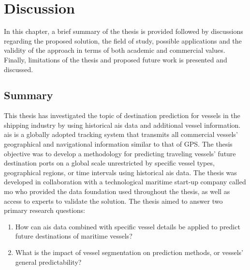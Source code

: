 \chapter{Discussion}
\label{chap:discussion}

In this chapter, a brief summary of the thesis is provided followed by discussions regarding the proposed solution, the field of study, possible applications and the validity of the approach in terms of both academic and commercial values. Finally, limitations of the thesis and proposed future work is presented and discussed.

\section{Summary}
\label{sec:summary}

This thesis has investigated the topic of destination prediction for vessels in the shipping industry by using historical \acrfull{ais} data and additional vessel information. \acrshort{ais} is a globally adopted tracking system that transmits all commercial vessels' geographical and navigational information similar to that of GPS\@. The thesis objective was to develop a methodology for predicting traveling vessels' future destination ports on a global scale unrestricted by specific vessel types, geographical regions, or time intervals using historical \acrshort{ais} data. The thesis was developed in collaboration with a technological maritime start-up company called \acrfull{mo} who provided the data foundation used throughout the thesis, as well as access to experts to validate the solution. The thesis aimed to answer two primary research questions:

\begin{enumerate}
    \item How can \acrshort{ais} data combined with specific vessel details be applied to predict future destinations of maritime vessels?
    \item What is the impact of vessel segmentation on prediction methods, or vessels' general predictability?
\end{enumerate}


